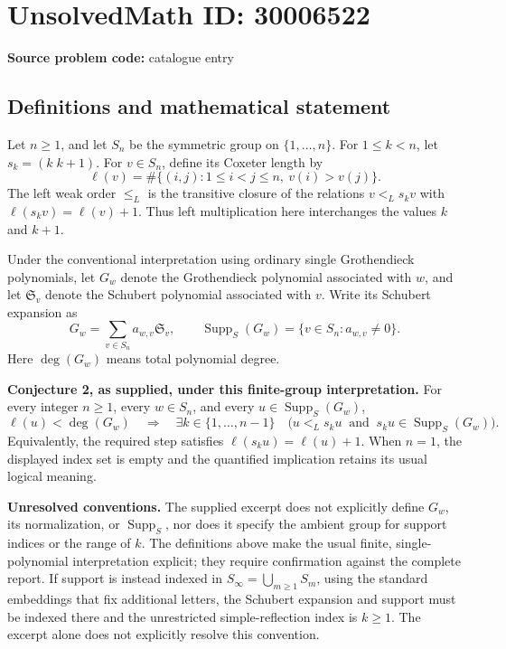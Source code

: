 \documentclass[11pt]{article}
\begin{document}
\section*{UnsolvedMath ID: 30006522}
\textbf{Source problem code:} catalogue entry
\subsection{Definitions and mathematical statement}
Let \(n\geq 1\), and let \(S_n\) be the symmetric group on \(\{1,\ldots,n\}\). For \(1\leq k<n\), let \(s_k=(k\;k+1)\). For \(v\in S_n\), define its Coxeter length by
\[
\ell(v)=\#\{(i,j):1\leq i<j\leq n,\ v(i)>v(j)\}.
\]
The left weak order \(\leq_L\) is the transitive closure of the relations \(v<_L s_kv\) with \(\ell(s_kv)=\ell(v)+1\). Thus left multiplication here interchanges the values \(k\) and \(k+1\).

Under the conventional interpretation using ordinary single Grothendieck polynomials, let \(G_w\) denote the Grothendieck polynomial associated with \(w\), and let \(\mathfrak S_v\) denote the Schubert polynomial associated with \(v\). Write its Schubert expansion as
\[
G_w=\sum_{v\in S_n}a_{w,v}\mathfrak S_v,
\qquad
\operatorname{Supp}_S(G_w)=\{v\in S_n:a_{w,v}\neq0\}.
\]
Here \(\deg(G_w)\) means total polynomial degree.

\textbf{Conjecture 2, as supplied, under this finite-group interpretation.} For every integer \(n\geq1\), every \(w\in S_n\), and every \(u\in\operatorname{Supp}_S(G_w)\),
\[
\ell(u)<\deg(G_w)
\quad\Longrightarrow\quad
\exists k\in\{1,\ldots,n-1\}\quad
\bigl(u<_L s_ku\ \text{ and }\ s_ku\in\operatorname{Supp}_S(G_w)\bigr).
\]
Equivalently, the required step satisfies \(\ell(s_ku)=\ell(u)+1\). When \(n=1\), the displayed index set is empty and the quantified implication retains its usual logical meaning.

\textbf{Unresolved conventions.} The supplied excerpt does not explicitly define \(G_w\), its normalization, or \(\operatorname{Supp}_S\), nor does it specify the ambient group for support indices or the range of \(k\). The definitions above make the usual finite, single-polynomial interpretation explicit; they require confirmation against the complete report. If support is instead indexed in \(S_\infty=\bigcup_{m\geq1}S_m\), using the standard embeddings that fix additional letters, the Schubert expansion and support must be indexed there and the unrestricted simple-reflection index is \(k\geq1\). The excerpt alone does not explicitly resolve this convention.
\end{document}
